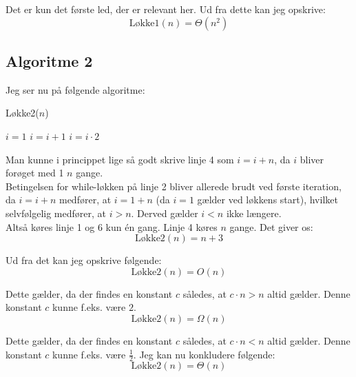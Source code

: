 Det er kun det første led, der er relevant her. Ud fra dette kan jeg opskrive:
\begin{equation*}
	\text{Løkke1}\left(n\right) = \Theta\left(n^2\right)
\end{equation*}

\subsection*{Algoritme 2}
Jeg ser nu på følgende algoritme:
\begin{algorithm}
	\caption{Løkke2($n$)}
	\label{løkke2}
	\begin{algorithmic}[1]
		\State $i = 1$
				\State $i = i + 1$
			\EndFor
			\State $i = i\cdot 2$
		\EndWhile
	\end{algorithmic}
\end{algorithm}

Man kunne i princippet lige så godt skrive linje 4 som $i = i + n$, da $i$ bliver forøget med 1 $n$ gange.\\

Betingelsen for while-løkken på linje 2 bliver allerede brudt ved første iteration,
da $i = i + n$ medfører, at $i = 1 + n$ (da $i = 1$ gælder ved løkkens start),
hvilket selvfølgelig medfører, at $i > n$. Derved gælder $i < n$ ikke længere.\\

Altså køres linje 1 og 6 kun én gang. Linje 4 køres $n$ gange. Det giver os:
\begin{equation*}
	\text{Løkke2}\left(n\right) = n + 3
\end{equation*}

Ud fra det kan jeg opskrive følgende:
\begin{equation*}
	\text{Løkke2}\left(n\right) = O(n)
\end{equation*}

Dette gælder, da der findes en konstant $c$ således, at $c\cdot n > n$ altid gælder. Denne konstant $c$
kunne f.eks. være $2$.
\begin{equation*}
	\text{Løkke2}\left(n\right) = \Omega(n)
\end{equation*}

Dette gælder, da der findes en konstant $c$ således, at $c\cdot n < n$ altid gælder. Denne konstant $c$
kunne f.eks. være $\frac{1}{2}$. Jeg kan nu konkludere følgende:
\begin{equation*}
	\text{Løkke2}\left(n\right) = \Theta(n)
\end{equation*}